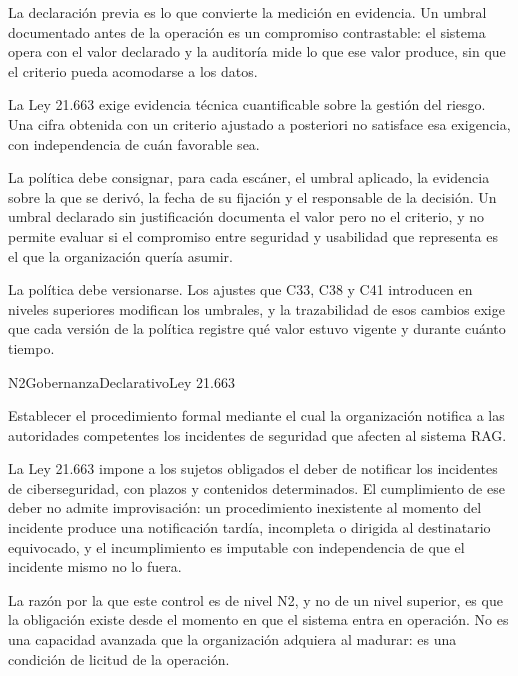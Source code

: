 La declaración previa es lo que convierte la medición en evidencia. Un umbral documentado antes de la operación es un compromiso contrastable: el sistema opera con el valor declarado y la auditoría mide lo que ese valor produce, sin que el criterio pueda acomodarse a los datos.

La Ley 21.663 exige evidencia técnica cuantificable sobre la gestión del riesgo. Una cifra obtenida con un criterio ajustado a posteriori no satisface esa exigencia, con independencia de cuán favorable sea.

La política debe consignar, para cada escáner, el umbral aplicado, la evidencia sobre la que se derivó, la fecha de su fijación y el responsable de la decisión. Un umbral declarado sin justificación documenta el valor pero no el criterio, y no permite evaluar si el compromiso entre seguridad y usabilidad que representa es el que la organización quería asumir.

La política debe versionarse. Los ajustes que C33, C38 y C41 introducen en niveles superiores modifican los umbrales, y la trazabilidad de esos cambios exige que cada versión de la política registre qué valor estuvo vigente y durante cuánto tiempo.


  {N2}{Gobernanza}{Declarativo}{Ley 21.663}

Establecer el procedimiento formal mediante el cual la organización notifica a las autoridades competentes los incidentes de seguridad que afecten al sistema RAG.

La Ley 21.663 impone a los sujetos obligados el deber de notificar los incidentes de ciberseguridad, con plazos y contenidos determinados. El cumplimiento de ese deber no admite improvisación: un procedimiento inexistente al momento del incidente produce una notificación tardía, incompleta o dirigida al destinatario equivocado, y el incumplimiento es imputable con independencia de que el incidente mismo no lo fuera.

La razón por la que este control es de nivel N2, y no de un nivel superior, es que la obligación existe desde el momento en que el sistema entra en operación. No es una capacidad avanzada que la organización adquiera al madurar: es una condición de licitud de la operación.

